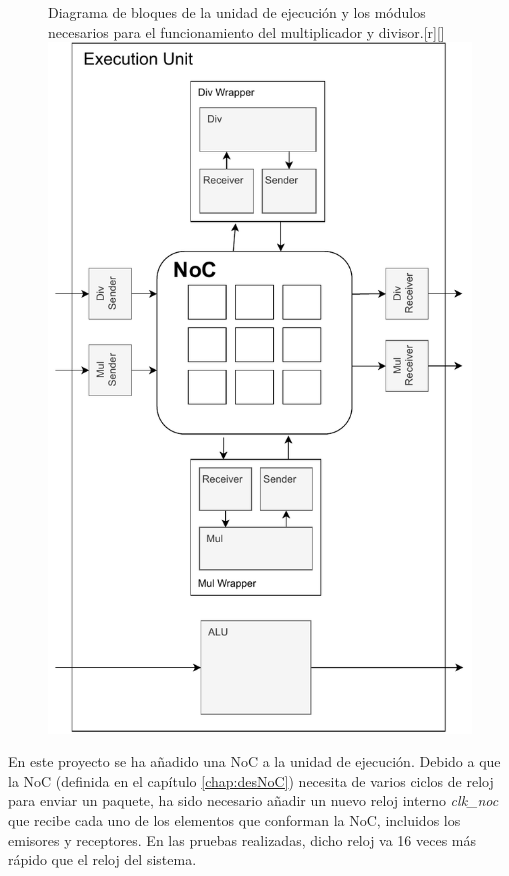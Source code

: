 \begin{figure}[h]
    \begin{captionbeside}{Diagrama de bloques de la unidad de ejecución y los módulos necesarios para el funcionamiento del multiplicador y divisor.}[r][\linewidth]
        \includegraphics[width=.6\linewidth]{images/diagrams/sketch_wrappers.drawio.pdf}%
    \end{captionbeside}
    \label{fig:sketch_wrappers}
\end{figure}

En este proyecto se ha añadido una NoC a la unidad de ejecución. Debido a que la NoC (definida en el capítulo \ref{chap:desNoC}) necesita de varios ciclos de reloj para enviar un paquete, ha sido necesario añadir un nuevo reloj interno \textit{clk\_noc} que recibe cada uno de los elementos que conforman la NoC, incluidos los emisores y receptores. En las pruebas realizadas, dicho reloj va 16 veces más rápido que el reloj del sistema.

